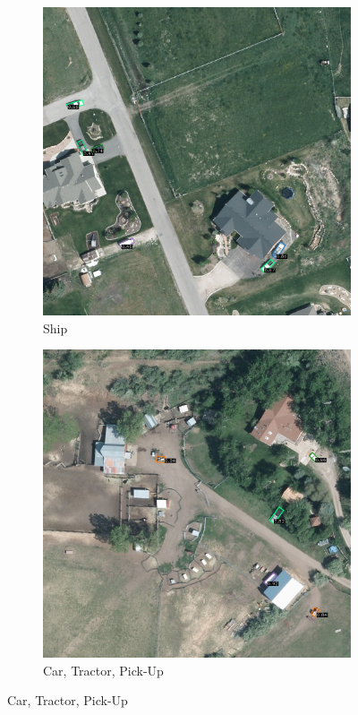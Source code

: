 \begin{figure}[h!]
    \begin{subfigure}[t]{0.38\textwidth}
        \centering
        \includegraphics[width=\linewidth]{images/015Results/01abb_vs_obb/comp_images/obb/509.png}
        \caption{Ship}
    \end{subfigure}
    \begin{subfigure}[t]{0.38\textwidth}
        \centering
        \includegraphics[width=\linewidth]{images/015Results/01abb_vs_obb/comp_images/obb/523.png}
        \caption{Car, Tractor, Pick-Up}
    \end{subfigure}
    

\end{figure}
